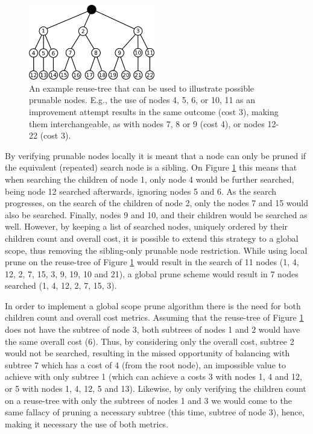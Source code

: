 \begin{figure}[t!]
\begin{center}
	\includegraphics[width=0.49\textwidth]{img/prune}
	\caption{An example reuse-tree that can be used to illustrate possible prunable nodes. E.g., the use of nodes 4, 5, 6, or 10, 11 as an improvement attempt results in the same outcome (cost 3), making them interchangeable, as with nodes 7, 8 or 9 (cost 4), or nodes 12-22 (cost 3).}
\label{fig:prune}
\end{center}
\vspace{-4mm}
\end{figure}

By verifying prunable nodes locally it is meant that a node can only be pruned if the equivalent (repeated) search node is a sibling. On Figure \ref{fig:prune} this means that when searching the children of node 1, only node 4 would be further searched, being node 12 searched afterwards, ignoring nodes 5 and 6. As the search progresses, on the search of the children of node 2, only the nodes 7 and 15 would also be searched. Finally, nodes 9 and 10, and their children would be searched as well. However, by keeping a list of searched nodes, uniquely ordered by their children count and overall cost, it is possible to extend this strategy to a global scope, thus removing the sibling-only prunable node restriction. While using local prune on the reuse-tree of Figure \ref{fig:prune} would result in the search of 11 nodes (1, 4, 12, 2, 7, 15, 3, 9, 19, 10 and 21), a global prune scheme would result in 7 nodes searched (1, 4, 12, 2, 7, 15, 3).

In order to implement a global scope prune algorithm there is the need for both children count and overall cost metrics. Assuming that the reuse-tree of Figure \ref{fig:prune} does not have the subtree of node 3, both subtrees of nodes 1 and 2 would have the same overall cost (6). Thus, by considering only the overall cost, subtree 2 would not be searched, resulting in the missed opportunity of balancing with subtree 7 which has a cost of 4 (from the root node), an impossible value to achieve with only subtree 1 (which can achieve a costs 3 with nodes 1, 4 and 12, or 5 with nodes 1, 4, 12, 5 and 13). Likewise, by only verifying the children count on a reuse-tree with only the subtrees of nodes 1 and 3 we would come to the same fallacy of pruning a necessary subtree (this time, subtree of node 3), hence, making it necessary the use of both metrics.

